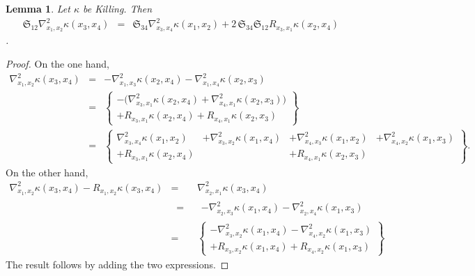 \documentclass[11pt,a4paper]{article}
\theoremstyle{plain}
\newtheorem{lemma}{Lemma}
\theoremstyle{remark}
\newcommand{\cyclic}{\mathfrak{S}}
\begin{document}
\bigskip
\begin{lemma}
  Let $\kappa$ be Killing. Then
 \begin{eqnarray}\label{eq:Killing_alternativ_*}\cyclic_{12}\nabla^2_{x_1,x_2}\kappa(x_3,x_4) &=& \cyclic_{34} \nabla^2_{x_3,x_4}\kappa(x_1,x_2)
+ 2\, \cyclic_{34}\cyclic_{12} R_{x_3,x_1}\kappa(x_2,x_4)
\end{eqnarray}.
\end{lemma}
\begin{proof} On the one hand,
\begin{eqnarray*}
\nabla^2_{x_1,x_2}\kappa(x_3,x_4) &=& - \nabla^2_{x_1,x_3}\kappa(x_2,x_4) - \nabla^2_{x_1,x_4}\kappa(x_2,x_3)\\
                     &=&   \left \lbrace\begin{array}{c} - \big (\nabla^2_{x_3,x_1}\kappa(x_2,x_4) + \nabla^2_{x_4,x_1}\kappa(x_2,x_3) \big )\\
                                                   + R_{x_3,x_1}\kappa(x_2,x_4) +  R_{x_4,x_1}\kappa(x_2,x_3) \end{array} \right \rbrace\\
                     &=&  \left \lbrace\begin{array}{cccc} 
                                  \nabla^2_{x_3,x_4}\kappa(x_1,x_2) &+ \nabla^2_{x_3,x_2}\kappa(x_1,x_4) &+ \nabla^2_{x_4,x_3}\kappa(x_1,x_2) &+ \nabla^2_{x_4,x_2}\kappa(x_1,x_3)\\
                                 + R_{x_3,x_1}\kappa(x_2,x_4) & &+ R_{x_4,x_1}\kappa(x_2,x_3) & \end{array} \right \rbrace.
\end{eqnarray*}
On the other hand,
\begin{eqnarray*}
\nabla^2_{x_1,x_2}\kappa(x_3,x_4) -  R_{x_1,x_2}\kappa(x_3,x_4) &=& \nabla^2_{x_2,x_1}\kappa(x_3,x_4)\\
&\;\;=\;\;& \left .\begin{array}{c}  - \nabla^2_{x_2,x_3}\kappa(x_1,x_4) - \nabla^2_{x_2,x_4}\kappa(x_1,x_3)
                                 \end{array} \right .\\
&=&  \left \lbrace \begin{array}{c} - \nabla^2_{x_3,x_2}\kappa(x_1,x_4) - \nabla^2_{x_4,x_2}\kappa(x_1,x_3)\\
                             + R_{x_3,x_2}\kappa(x_1,x_4) + R_{x_4,x_2}\kappa(x_1,x_3)\end{array} \right \rbrace
\end{eqnarray*}
The result follows by adding the two expressions.
\end{proof}
\end{document}
